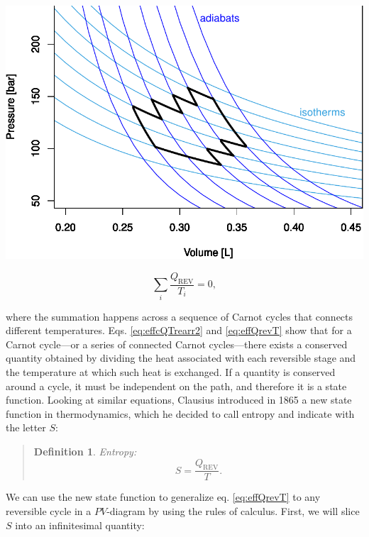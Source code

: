 \documentclass[
]{book}
\theoremstyle{definition}
\newtheorem{definition}{Definition}[chapter]
\theoremstyle{definition}
\theoremstyle{definition}
\theoremstyle{remark}
\begin{document}
\begin{center}\includegraphics{pchem1_files/figure-latex/unnamed-chunk-12-1} \end{center}

\begin{equation}
\sum_i \frac{Q_{\mathrm{REV}}}{T_i} = 0,
\label{eq:effQrevT}
\end{equation}

where the summation happens across a sequence of Carnot cycles that connects different temperatures. Eqs. \eqref{eq:effcQTrearr2} and \eqref{eq:effQrevT} show that for a Carnot cycle---or a series of connected Carnot cycles---there exists a conserved quantity obtained by dividing the heat associated with each reversible stage and the temperature at which such heat is exchanged. If a quantity is conserved around a cycle, it must be independent on the path, and therefore it is a state function. Looking at similar equations, Clausius introduced in 1865 a new state function in thermodynamics, which he decided to call entropy and indicate with the letter \(S\):

\begin{quote}
\begin{definition}
\protect\hypertarget{def:entropy}{}{\label{def:entropy} }\emph{Entropy:} \begin{equation}
S = \frac{Q_{\mathrm{REV}}}{T}.
\end{equation}
\end{definition}
\end{quote}

We can use the new state function to generalize eq. \eqref{eq:effQrevT} to any reversible cycle in a \(PV\)-diagram by using the rules of calculus. First, we will slice \(S\) into an infinitesimal quantity:
\end{document}
